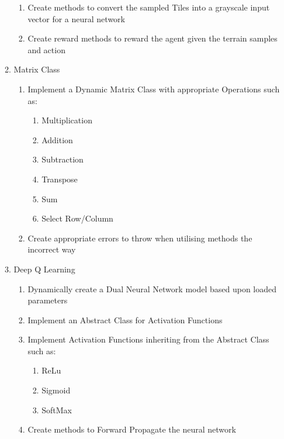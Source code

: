 \begin{flushleft}
\begin{enumerate}
\begin{enumerate}
\begin{enumerate}
                        \item Create methods to convert the sampled Tiles into a grayscale input vector for a neural network
                        \item Create reward methods to reward the agent given the terrain samples and action
                    \end{enumerate}   
                \item Matrix Class
                    \begin{enumerate}
                        \item Implement a Dynamic Matrix Class with appropriate Operations such as:
                            \begin{enumerate}
                                \item Multiplication
                                \item Addition
                                \item Subtraction
                                \item Transpose
                                \item Sum
                                \item Select Row/Column
                            \end{enumerate}
                        \item Create appropriate errors to throw when utilising methods the incorrect way
                    \end{enumerate}   
                \item Deep Q Learning
                    \begin{enumerate}
                        \item Dynamically create a Dual Neural Network model based upon loaded parameters
                        \item Implement an Abstract Class for Activation Functions
                        \item Implement Activation Functions inheriting from the Abstract Class such as:
                        \begin{enumerate}
                            \item ReLu
                            \item Sigmoid
                            \item SoftMax
                        \end{enumerate}
                        \item Create methods to Forward Propagate the neural network

\end{enumerate}
\end{enumerate}
\end{enumerate}
\end{flushleft}
